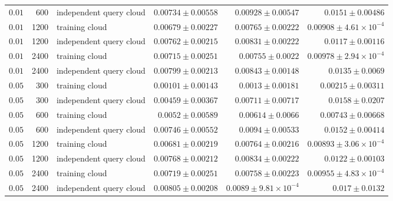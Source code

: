 \documentclass[
  11pt,
  letterpaper,
  onehalfspacing,
  normalmargins,
  equalmargins,
  oneside
]{ut-thesis}
\begin{document}
\begin{longtable}{r r L{0.25\textwidth} r r r}
$0.01$ & 600 & independent query cloud & $0.00734\pm 0.00558$ & $0.00928\pm 0.00547$ & $0.0151\pm 0.00486$ \\
$0.01$ & 1200 & training cloud & $0.00679\pm 0.00227$ & $0.00765\pm 0.00222$ & $0.00908\pm 4.61\times10^{-4}$ \\
$0.01$ & 1200 & independent query cloud & $0.00762\pm 0.00215$ & $0.00831\pm 0.00222$ & $0.0117\pm 0.00116$ \\
$0.01$ & 2400 & training cloud & $0.00715\pm 0.00251$ & $0.00755\pm 0.0022$ & $0.00978\pm 2.94\times10^{-4}$ \\
$0.01$ & 2400 & independent query cloud & $0.00799\pm 0.00213$ & $0.00843\pm 0.00148$ & $0.0135\pm 0.0069$ \\
$0.05$ & 300 & training cloud & $0.00101\pm 0.00143$ & $0.0013\pm 0.00181$ & $0.00215\pm 0.00311$ \\
$0.05$ & 300 & independent query cloud & $0.00459\pm 0.00367$ & $0.00711\pm 0.00717$ & $0.0158\pm 0.0207$ \\
$0.05$ & 600 & training cloud & $0.0052\pm 0.00589$ & $0.00614\pm 0.0066$ & $0.00743\pm 0.00668$ \\
$0.05$ & 600 & independent query cloud & $0.00746\pm 0.00552$ & $0.0094\pm 0.00533$ & $0.0152\pm 0.00414$ \\
$0.05$ & 1200 & training cloud & $0.00681\pm 0.00219$ & $0.00764\pm 0.00216$ & $0.00893\pm 3.06\times10^{-4}$ \\
$0.05$ & 1200 & independent query cloud & $0.00768\pm 0.00212$ & $0.00834\pm 0.00222$ & $0.0122\pm 0.00103$ \\
$0.05$ & 2400 & training cloud & $0.00719\pm 0.00251$ & $0.00758\pm 0.00223$ & $0.00955\pm 4.83\times10^{-4}$ \\
$0.05$ & 2400 & independent query cloud & $0.00805\pm 0.00208$ & $0.0089\pm 9.81\times10^{-4}$ & $0.017\pm 0.0132$ \\
\end{longtable}
\endgroup
\end{document}
